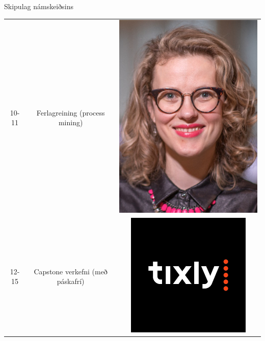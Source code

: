 \documentclass[
    NAME={Dr. Helga Ingimundardóttir},
    EMAIL={helgaingim@hi.is},
    FACULTY={Iðnaðarverkfræði},
    TITLE={Hagnýt hæfni í brennidepli},
    SUBTITLE={Endurskoðun á námskeiði í Viðskiptagreind},
    SEMINAR={Ráðstefna kennsluakademíunnar},
    DATE={22 nóvember, 2024},
    WIDE={true},
    ICELANDIC={true}
]{HI-LaTeX/hi-beamer}
\begin{document}
\begin{frame}{Skipulag námskeiðsins}
\begin{table}
\begin{tabular}{ccc}
            10-11 & Ferlagreining (process mining)            & \includegraphics[height=.08\textheight]{figures/helgaingim} \\
            12-15 & Capstone verkefni (með páskafrí) & \includegraphics[height=.08\textheight]{figures/company}    
        \end{tabular}
    \end{table}
\end{frame}
\end{document}
